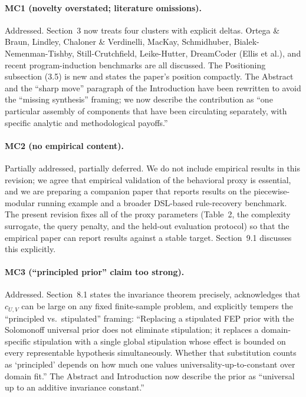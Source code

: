 \documentclass[11pt]{article}
\begin{document}
\paragraph{MC1 (novelty overstated; literature omissions).} Addressed. Section~3 now treats four clusters with explicit deltas. Ortega \& Braun, Lindley, Chaloner \& Verdinelli, MacKay, Schmidhuber, Bialek-Nemenman-Tishby, Still-Crutchfield, Leike-Hutter, DreamCoder (Ellis et al.), and recent program-induction benchmarks are all discussed. The Positioning subsection (3.5) is new and states the paper's position compactly. The Abstract and the ``sharp move'' paragraph of the Introduction have been rewritten to avoid the ``missing synthesis'' framing; we now describe the contribution as ``one particular assembly of components that have been circulating separately, with specific analytic and methodological payoffs.''

\paragraph{MC2 (no empirical content).} Partially addressed, partially deferred. We do not include empirical results in this revision; we agree that empirical validation of the behavioral proxy is essential, and we are preparing a companion paper that reports results on the piecewise-modular running example and a broader DSL-based rule-recovery benchmark. The present revision fixes all of the proxy parameters (Table~2, the complexity surrogate, the query penalty, and the held-out evaluation protocol) so that the empirical paper can report results against a stable target. Section~9.1 discusses this explicitly.

\paragraph{MC3 (``principled prior'' claim too strong).} Addressed. Section~8.1 states the invariance theorem precisely, acknowledges that $c_{U,V}$ can be large on any fixed finite-sample problem, and explicitly tempers the ``principled vs.\ stipulated'' framing: ``Replacing a stipulated FEP prior with the Solomonoff universal prior does not eliminate stipulation; it replaces a domain-specific stipulation with a single global stipulation whose effect is bounded on every representable hypothesis simultaneously. Whether that substitution counts as `principled' depends on how much one values universality-up-to-constant over domain fit.'' The Abstract and Introduction now describe the prior as ``universal up to an additive invariance constant.''
\end{document}
